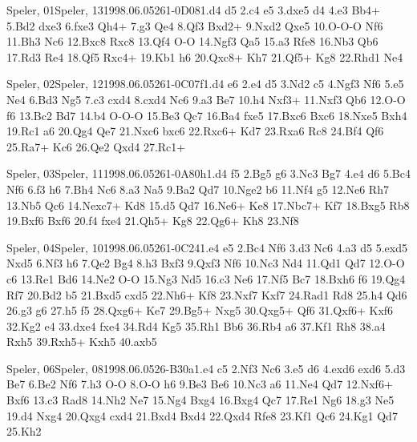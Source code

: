 \documentclass[twocolumn,a4paper,10pt]{report}
\begin{document}
\begin{chessgame}{Speler, 01}{Speler, 13}{1998.06.05}{26}{1-0}{D08}{1.d4 d5 2.c4 e5 3.dxe5 d4 4.e3 Bb4+ 5.Bd2 dxe3 6.fxe3 Qh4+ 7.g3 Qe4 8.Qf3 Bxd2+ 9.Nxd2 Qxe5 10.O-O-O Nf6 11.Bh3 Nc6 12.Bxc8 Rxc8 13.Qf4 O-O 14.Ngf3 Qa5 15.a3 Rfe8 16.Nb3 Qb6 17.Rd3 Re4 18.Qf5 Rxc4+ 19.Kb1 h6 20.Qxc8+ Kh7 21.Qf5+ Kg8 22.Rhd1 Ne4}\end{chessgame}
\begin{chessgame}{Speler, 02}{Speler, 12}{1998.06.05}{26}{1-0}{C07f}{1.d4 e6 2.e4 d5 3.Nd2 c5 4.Ngf3 Nf6 5.e5 Ne4 6.Bd3 Ng5 7.c3 cxd4 8.cxd4 Nc6 9.a3 Be7 10.h4 Nxf3+ 11.Nxf3 Qb6 12.O-O f6 13.Bc2 Bd7 14.b4 O-O-O 15.Be3 Qc7 16.Ba4 fxe5 17.Bxc6 Bxc6 18.Nxe5 Bxh4 19.Rc1 a6 20.Qg4 Qe7 21.Nxc6 bxc6 22.Rxc6+ Kd7 23.Rxa6 Rc8 24.Bf4 Qf6 25.Ra7+ Kc6 26.Qe2 Qxd4 27.Rc1+}\end{chessgame}
\begin{chessgame}{Speler, 03}{Speler, 11}{1998.06.05}{26}{1-0}{A80h}{1.d4 f5 2.Bg5 g6 3.Nc3 Bg7 4.e4 d6 5.Bc4 Nf6 6.f3 h6 7.Bh4 Nc6 8.a3 Na5 9.Ba2 Qd7 10.Nge2 b6 11.Nf4 g5 12.Ne6 Rh7 13.Nb5 Qc6 14.Nexc7+ Kd8 15.d5 Qd7 16.Ne6+ Ke8 17.Nbc7+ Kf7 18.Bxg5 Rb8 19.Bxf6 Bxf6 20.f4 fxe4 21.Qh5+ Kg8 22.Qg6+ Kh8 23.Nf8}\end{chessgame}
\begin{chessgame}{Speler, 04}{Speler, 10}{1998.06.05}{26}{1-0}{C24}{1.e4 e5 2.Bc4 Nf6 3.d3 Nc6 4.a3 d5 5.exd5 Nxd5 6.Nf3 h6 7.Qe2 Bg4 8.h3 Bxf3 9.Qxf3 Nf6 10.Nc3 Nd4 11.Qd1 Qd7 12.O-O c6 13.Re1 Bd6 14.Ne2 O-O 15.Ng3 Nd5 16.c3 Ne6 17.Nf5 Bc7 18.Bxh6 f6 19.Qg4 Rf7 20.Bd2 b5 21.Bxd5 cxd5 22.Nh6+ Kf8 23.Nxf7 Kxf7 24.Rad1 Rd8 25.h4 Qd6 26.g3 g6 27.h5 f5 28.Qxg6+ Ke7 29.Bg5+ Nxg5 30.Qxg5+ Qf6 31.Qxf6+ Kxf6 32.Kg2 e4 33.dxe4 fxe4 34.Rd4 Kg5 35.Rh1 Bb6 36.Rb4 a6 37.Kf1 Rh8 38.a4 Rxh5 39.Rxh5+ Kxh5 40.axb5}\end{chessgame}
\begin{chessgame}{Speler, 06}{Speler, 08}{1998.06.05}{26}{\textonehalf-\textonehalf}{B30a}{1.e4 c5 2.Nf3 Nc6 3.e5 d6 4.exd6 exd6 5.d3 Be7 6.Be2 Nf6 7.h3 O-O 8.O-O h6 9.Be3 Be6 10.Nc3 a6 11.Ne4 Qd7 12.Nxf6+ Bxf6 13.c3 Rad8 14.Nh2 Ne7 15.Ng4 Bxg4 16.Bxg4 Qc7 17.Re1 Ng6 18.g3 Ne5 19.d4 Nxg4 20.Qxg4 cxd4 21.Bxd4 Bxd4 22.Qxd4 Rfe8 23.Kf1 Qc6 24.Kg1 Qd7 25.Kh2}\end{chessgame}
\end{document}
